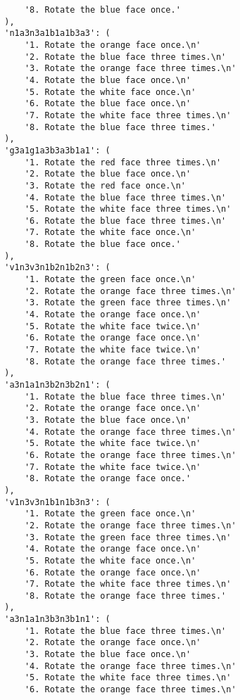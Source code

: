 \begin{lstlisting}
            '8. Rotate the blue face once.'
        ),
        'n1a3n3a1b1a1b3a3': (
            '1. Rotate the orange face once.\n'
            '2. Rotate the blue face three times.\n'
            '3. Rotate the orange face three times.\n'
            '4. Rotate the blue face once.\n'
            '5. Rotate the white face once.\n'
            '6. Rotate the blue face once.\n'
            '7. Rotate the white face three times.\n'
            '8. Rotate the blue face three times.'
        ),
        'g3a1g1a3b3a3b1a1': (
            '1. Rotate the red face three times.\n'
            '2. Rotate the blue face once.\n'
            '3. Rotate the red face once.\n'
            '4. Rotate the blue face three times.\n'
            '5. Rotate the white face three times.\n'
            '6. Rotate the blue face three times.\n'
            '7. Rotate the white face once.\n'
            '8. Rotate the blue face once.'
        ),
        'v1n3v3n1b2n1b2n3': (
            '1. Rotate the green face once.\n'
            '2. Rotate the orange face three times.\n'
            '3. Rotate the green face three times.\n'
            '4. Rotate the orange face once.\n'
            '5. Rotate the white face twice.\n'
            '6. Rotate the orange face once.\n'
            '7. Rotate the white face twice.\n'
            '8. Rotate the orange face three times.'
        ),
        'a3n1a1n3b2n3b2n1': (
            '1. Rotate the blue face three times.\n'
            '2. Rotate the orange face once.\n'
            '3. Rotate the blue face once.\n'
            '4. Rotate the orange face three times.\n'
            '5. Rotate the white face twice.\n'
            '6. Rotate the orange face three times.\n'
            '7. Rotate the white face twice.\n'
            '8. Rotate the orange face once.'
        ),
        'v1n3v3n1b1n1b3n3': (
            '1. Rotate the green face once.\n'
            '2. Rotate the orange face three times.\n'
            '3. Rotate the green face three times.\n'
            '4. Rotate the orange face once.\n'
            '5. Rotate the white face once.\n'
            '6. Rotate the orange face once.\n'
            '7. Rotate the white face three times.\n'
            '8. Rotate the orange face three times.'
        ),
        'a3n1a1n3b3n3b1n1': (
            '1. Rotate the blue face three times.\n'
            '2. Rotate the orange face once.\n'
            '3. Rotate the blue face once.\n'
            '4. Rotate the orange face three times.\n'
            '5. Rotate the white face three times.\n'
            '6. Rotate the orange face three times.\n'

\end{lstlisting}
